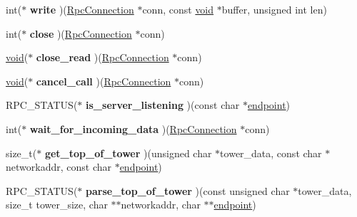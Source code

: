 \begin{DoxyCompactItemize}
int($\ast$ {\bfseries write} )(\hyperlink{struct___rpc_connection}{Rpc\+Connection} $\ast$conn, const \hyperlink{interfacevoid}{void} $\ast$buffer, unsigned int len)
\item 
\mbox{\label{structconnection__ops_ac1db4bf639b4b543307e62369f9ab90f}} 
int($\ast$ {\bfseries close} )(\hyperlink{struct___rpc_connection}{Rpc\+Connection} $\ast$conn)
\item 
\mbox{\label{structconnection__ops_ac9fc9219fd8555f1701ece1a558115e3}} 
\hyperlink{interfacevoid}{void}($\ast$ {\bfseries close\+\_\+read} )(\hyperlink{struct___rpc_connection}{Rpc\+Connection} $\ast$conn)
\item 
\mbox{\label{structconnection__ops_af97b47838198b05d696f2abd24fbddf7}} 
\hyperlink{interfacevoid}{void}($\ast$ {\bfseries cancel\+\_\+call} )(\hyperlink{struct___rpc_connection}{Rpc\+Connection} $\ast$conn)
\item 
\mbox{\label{structconnection__ops_ad4dfe4a1b6e0cd09ee8d47bca5f1d618}} 
R\+P\+C\+\_\+\+S\+T\+A\+T\+US($\ast$ {\bfseries is\+\_\+server\+\_\+listening} )(const char $\ast$\hyperlink{structendpoint}{endpoint})
\item 
\mbox{\label{structconnection__ops_abb4445d84a31b5c2595500be0d1b7926}} 
int($\ast$ {\bfseries wait\+\_\+for\+\_\+incoming\+\_\+data} )(\hyperlink{struct___rpc_connection}{Rpc\+Connection} $\ast$conn)
\item 
\mbox{\label{structconnection__ops_a0b73a10123c5eab82cfc8788a06fc64b}} 
size\+\_\+t($\ast$ {\bfseries get\+\_\+top\+\_\+of\+\_\+tower} )(unsigned char $\ast$tower\+\_\+data, const char $\ast$networkaddr, const char $\ast$\hyperlink{structendpoint}{endpoint})
\item 
\mbox{\label{structconnection__ops_aa6375a463365627883d4cefea6f0e8a6}} 
R\+P\+C\+\_\+\+S\+T\+A\+T\+US($\ast$ {\bfseries parse\+\_\+top\+\_\+of\+\_\+tower} )(const unsigned char $\ast$tower\+\_\+data, size\+\_\+t tower\+\_\+size, char $\ast$$\ast$networkaddr, char $\ast$$\ast$\hyperlink{structendpoint}{endpoint})
\item 
\mbox{\label{structconnection__ops_aac96908ccb1abc5b0debe85d3ccc0fdb}} 

\end{DoxyCompactItemize}

